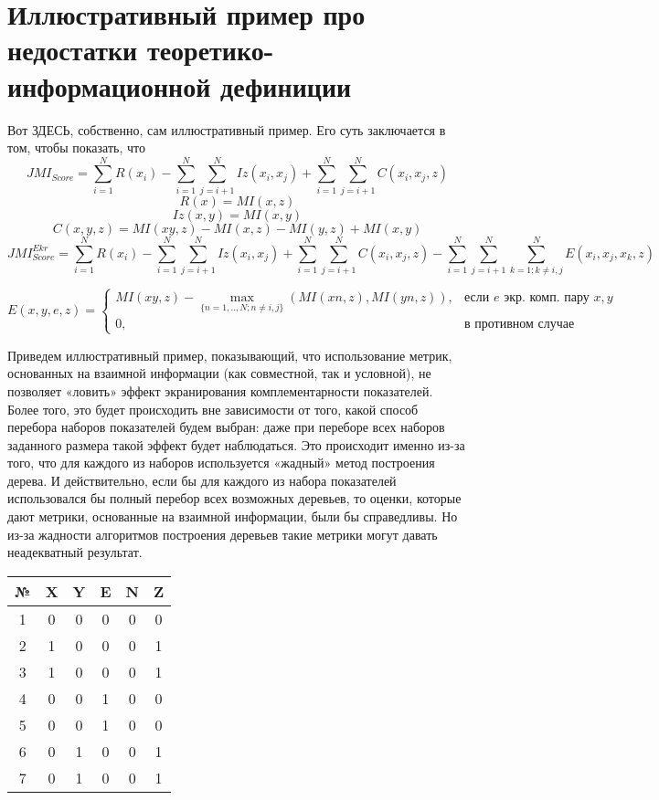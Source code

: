 \documentclass[12pt]{a&t}
\begin{document}
\section{Иллюстративный пример про недостатки теоретико-информационной дефиниции}

Вот ЗДЕСЬ, собственно, сам иллюстративный пример. Его суть заключается в том, чтобы показать, что 
\[JMI_{Score} = \sum_{i=1}^N R(x_i) -
\sum_{i=1}^N \sum_{j=i+1}^N Iz(x_i, x_j) +
\sum_{i=1}^N \sum_{j=i+1}^N C(x_i, x_j,z)  
\]
\[R(x) = MI(x,z)\]
\[Iz(x,y) = MI(x,y)\]
\[C(x,y,z) = MI(xy,z) - MI(x,z) - MI(y,z) + MI(x,y)\]\[JMI_{Score}^{Ekr} = \sum_{i=1}^N R(x_i) -
\sum_{i=1}^N \sum_{j=i+1}^N Iz(x_i, x_j) +
\sum_{i=1}^N \sum_{j=i+1}^N C(x_i, x_j,z)-  
\sum_{i=1}^N \sum_{j=i+1}^N \sum_{k=1; k \neq i,j}^N E(x_i, x_j,x_k,z)
\]

\[E(x,y,e,z) = \begin{cases}
  MI(xy,z) - \max\limits_{\{n=1,..,N; n \neq i,j \}} (MI(xn,z), MI(yn,z)),  & \mbox{если } e \mbox{ экр. комп. пару } x,y \\
  0, & \mbox{в противном случае }
\end{cases} \]


Приведем иллюстративный пример, показывающий, что использование метрик, основанных на взаимной информации (как совместной, так и условной), не позволяет «ловить» эффект экранирования комплементарности показателей. Более того, это будет происходить вне зависимости от того, какой способ перебора наборов показателей будем выбран: даже при переборе всех наборов заданного размера такой эффект будет наблюдаться. Это происходит именно из-за того, что для каждого из наборов используется «жадный» метод построения дерева. И действительно, если бы для каждого из набора показателей использовался бы полный перебор всех возможных деревьев, то оценки, которые дают метрики, основанные на взаимной информации, были бы справедливы. Но из-за жадности алгоритмов построения деревьев такие метрики могут давать неадекватный результат. 

\begin{center}
\begin{tabular}{ |c||c|c|c|c|c| } 
  \hline
  № & X & Y & E & N & Z \\
 \hline
 \hline
 1 & 0 & 0 & 0 & 0 & 0 \\ 
 2 & 1 & 0 & 0 & 0 & 1 \\ 
 3 & 1 & 0 & 0 & 0 & 1 \\ 
 4 & 0 & 0 & 1 & 0 & 0 \\ 
 5 & 0 & 0 & 1 & 0 & 0 \\ 
 6 & 0 & 1 & 0 & 0 & 1 \\ 
 7 & 0 & 1 & 0 & 0 & 1 \\ 
 \hline
\end{tabular}
\end{center}
\end{document}
